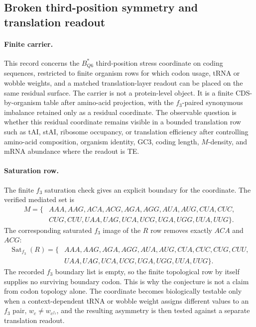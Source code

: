 \subsection{Broken third-position symmetry and translation readout}\label{subsec:q6-f3-stress-wobble-broken-translation-readout-cross-layer}

\paragraph{Finite carrier.}
This record concerns the $B^{\ast}_{Q6}$ third-position stress coordinate on coding sequences, restricted to finite organism rows for which codon usage, tRNA or wobble weights, and a matched translation-layer readout can be placed on the same residual surface.  The carrier is not a protein-level object.  It is a finite CDS-by-organism table after amino-acid projection, with the $f_3$-paired synonymous imbalance retained only as a residual coordinate.  The observable question is whether this residual coordinate remains visible in a bounded translation row such as tAI, stAI, ribosome occupancy, or translation efficiency after controlling amino-acid composition, organism identity, GC3, coding length, $M$-density, and mRNA abundance where the readout is TE.

\paragraph{Saturation row.}
The finite $f_3$ saturation check gives an explicit boundary for the coordinate.  The verified mediated set is
$$
\begin{aligned}
M=\{&AAA,AAG,ACA,ACG,AGA,AGG,AUA,AUG,CUA,CUC,\\
& CUG,CUU,UAA,UAG,UCA,UCG,UGA,UGG,UUA,UUG\}.
\end{aligned}
$$
The corresponding saturated $f_3$ image of the $R$ row removes exactly $ACA$ and $ACG$:
$$
\begin{aligned}
\operatorname{Sat}_{f_3}(R)=\{&AAA,AAG,AGA,AGG,AUA,AUG,CUA,CUC,CUG,CUU,\\
& UAA,UAG,UCA,UCG,UGA,UGG,UUA,UUG\}.
\end{aligned}
$$
The recorded $f_3$ boundary list is empty, so the finite topological row by itself supplies no surviving boundary codon.  This is why the conjecture is not a claim from codon topology alone.  The coordinate becomes biologically testable only when a context-dependent tRNA or wobble weight assigns different values to an $f_3$ pair, $w_c \ne w_{c^{f_3}}$, and the resulting asymmetry is then tested against a separate translation readout.

